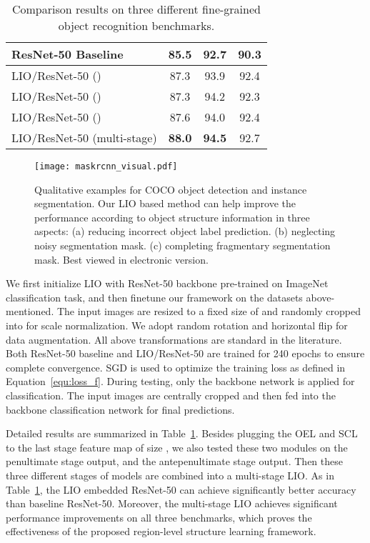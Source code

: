 \documentclass[10pt,twocolumn,letterpaper]{article}
\begin{document}
\begin{table}[!t]
\begin{center}
\begin{tabular}{|l|c|c|c|}
    ResNet-50 Baseline  & 85.5 & 92.7 & 90.3 \\
    \hline
    LIO/ResNet-50 ()    & 87.3         & 93.9           & 92.4          \\ 
    LIO/ResNet-50 ()    & 87.3         & 94.2            & 92.3          \\
    LIO/ResNet-50 ()    & 87.6         & 94.0         & 92.4          \\
    LIO/ResNet-50 (multi-stage)    & \textbf{88.0}&    \textbf{94.5}          &    92.7          \\
    \hline
    \end{tabular}
\end{center}
\caption{Comparison results on three different fine-grained object recognition benchmarks.}
\label{tab:exp-fine-grained}
\end{table}

\begin{figure*}[!ht]
    \centering
    \texttt{[image: maskrcnn\_visual.pdf]}
    \caption{Qualitative examples for COCO object detection and instance segmentation. Our LIO based method can help improve the performance according to object structure information in three aspects: (a) reducing incorrect object label prediction. (b) neglecting noisy segmentation mask. (c) completing fragmentary segmentation mask. Best viewed in electronic version.}
    \label{fig:maskrcnn_visualization}
\end{figure*}

We first initialize LIO with ResNet-50 backbone pre-trained on ImageNet classification task, and then finetune our framework on the datasets above-mentioned. The input images are resized to a fixed size of  and randomly cropped into  for scale normalization. We adopt random rotation and horizontal flip for data augmentation. All above transformations are standard in the literature. Both ResNet-50 baseline and LIO/ResNet-50 are trained for 240 epochs to ensure complete convergence. SGD is used to optimize the training loss as defined in Equation~\ref{equ:loss_f}. 
During testing, only the backbone network is applied for classification. The input images are centrally cropped and then fed into the backbone classification network for final predictions.

Detailed results are summarized in Table~\ref{tab:exp-fine-grained}. Besides plugging the OEL and SCL to the last stage feature map of size , we also tested these two modules on the penultimate stage  output, and the antepenultimate stage  output. Then these three different stages of models are combined into a multi-stage LIO. As in Table~\ref{tab:exp-fine-grained}, the LIO embedded ResNet-50 can achieve significantly better accuracy than baseline ResNet-50. Moreover, the multi-stage LIO achieves significant performance improvements on all three benchmarks, which proves the effectiveness of the proposed region-level structure learning framework. 
\end{document}
